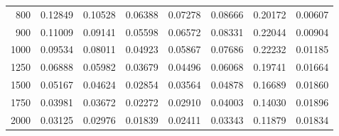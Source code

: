 \begin{table}[ht]
\begin{tabular}{r|c|c|c|c|c|c|c}
      800 & 0.12849 & 0.10528 & 0.06388 & 0.07278 & 0.08666 & 0.20172 & 0.00607 \\
      900 & 0.11009 & 0.09141 & 0.05598 & 0.06572 & 0.08331 & 0.22044 & 0.00904 \\
     1000 & 0.09534 & 0.08011 & 0.04923 & 0.05867 & 0.07686 & 0.22232 & 0.01185 \\
     1250 & 0.06888 & 0.05982 & 0.03679 & 0.04496 & 0.06068 & 0.19741 & 0.01664 \\
     1500 & 0.05167 & 0.04624 & 0.02854 & 0.03564 & 0.04878 & 0.16689 & 0.01860 \\
     1750 & 0.03981 & 0.03672 & 0.02272 & 0.02910 & 0.04003 & 0.14030 & 0.01896 \\
     2000 & 0.03125 & 0.02976 & 0.01839 & 0.02411 & 0.03343 & 0.11879 & 0.01834 \\ \cline{1-8}
    \end{tabular}
    \label{tab:XRayEffOCX1}
\end{table}

